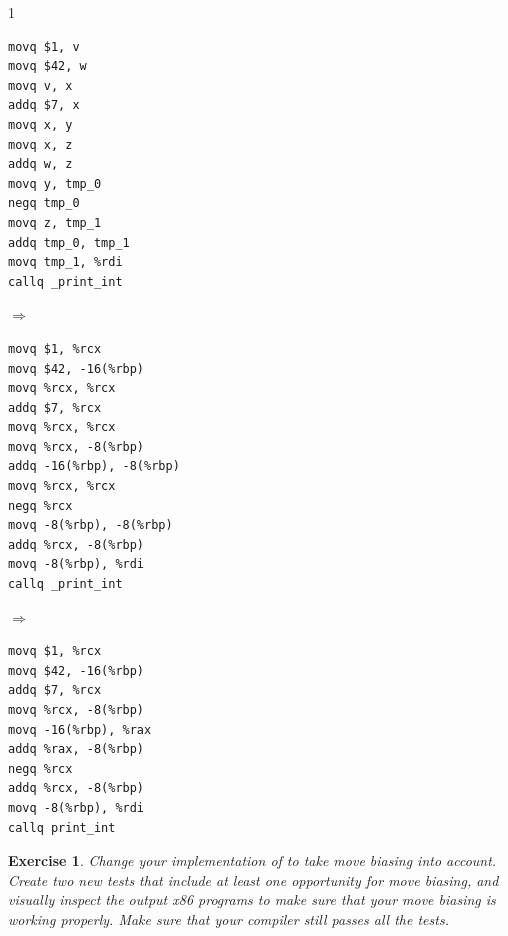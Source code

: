 \documentclass[7x10]{TimesAPriori_MIT}%
\def\pythonEd{1}
\def\edition{0}
\newtheorem{exercise}[theorem]{Exercise}
\numberwithin{theorem}{chapter}
\numberwithin{definition}{chapter}
\numberwithin{equation}{chapter}
\begin{document}
{\if\edition\pythonEd
\begin{minipage}{0.20\textwidth}
\begin{lstlisting}[basicstyle=\ttfamily\footnotesize]
movq $1, v
movq $42, w
movq v, x
addq $7, x
movq x, y
movq x, z
addq w, z
movq y, tmp_0
negq tmp_0
movq z, tmp_1
addq tmp_0, tmp_1
movq tmp_1, %rdi
callq _print_int
\end{lstlisting}
\end{minipage}
${\Rightarrow\qquad}$
\begin{minipage}{0.30\textwidth}
\begin{lstlisting}[basicstyle=\ttfamily\footnotesize]
movq $1, %rcx
movq $42, -16(%rbp)
movq %rcx, %rcx
addq $7, %rcx
movq %rcx, %rcx
movq %rcx, -8(%rbp)
addq -16(%rbp), -8(%rbp)
movq %rcx, %rcx
negq %rcx
movq -8(%rbp), -8(%rbp)
addq %rcx, -8(%rbp)
movq -8(%rbp), %rdi
callq _print_int
\end{lstlisting}
\end{minipage}
${\Rightarrow\qquad}$
\begin{minipage}{0.20\textwidth}
\begin{lstlisting}[basicstyle=\ttfamily\footnotesize]
movq $1, %rcx
movq $42, -16(%rbp)
addq $7, %rcx
movq %rcx, -8(%rbp)
movq -16(%rbp), %rax
addq %rax, -8(%rbp)
negq %rcx
addq %rcx, -8(%rbp)
movq -8(%rbp), %rdi
callq print_int
\end{lstlisting}
\end{minipage}
\fi}

\begin{exercise}\normalfont\normalsize
Change your implementation of  to take move
biasing into account. Create two new tests that include at least one
opportunity for move biasing, and visually inspect the output x86
programs to make sure that your move biasing is working properly. Make
sure that your compiler still passes all the tests.
\end{exercise}




\end{document}
